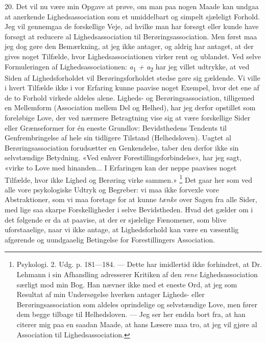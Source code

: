 \documentclass[12pt,a4paper,openany]{book}
\newcommand{\opage}[1]{\marginnote{\footnotesize\textit{[#1]}}}
\begin{document}
20. Det vil nu være min Opgave at prøve, om man paa nogen Maade kan undgaa at
anerkende Lighedsassociation som et umiddelbart og simpelt sjæleligt Forhold.
Jeg vil gennemgaa de forskellige Veje, ad hvilke man har forsøgt eller kunde
have forsøgt at reducere al Lighedsassociation til Berøringsassociation. Men
først maa jeg dog gøre den Bemærkning, at jeg ikke antager, og aldrig har
antaget, at der gives noget Tilfælde, hvor Lighedsassociationen virker rent og
ublandet. Ved selve Formuleringen af Lighedsassociationen:
\textit{a}\textsubscript{1} \textit{ + a}\textsubscript{2} har jeg villet
udtrykke, at ved Siden af Lighedsforholdet vil Berøringsforholdet stedse gøre
sig gældende. Vi ville i hvert Tilfælde ikke i vor Erfaring kunne paavise noget
Exempel, hvor det ene af de to Forhold virkede aldeles alene. Ligheds- og
Berøringsassociation, tilligemed en Mellemform (Association mellem Del og
Helhed), har jeg derfor opstillet som foreløbige Love, der ved nærmere
Betragtning vise sig at være forskellige Sider eller Grænseformer for én eneste
Grundlov: Bevidsthedens Tendents til Genfrembringelse af hele sin tidligere
Tilstand (Helhedsloven). Uagtet al Berøringsassociation forudsætter en
Genkendelse, taber den derfor ikke sin selvstændige Betydning. «Ved enhver
Forestillingsforbindelse», har jeg sagt, «virke to Love med hinanden... I
Erfaringen kan der neppe paavises noget Tilfælde, hvor ikke Lighed og Berøring
virke sammen.»%
\footnote[1]{Psykologi. 2. Udg. p. 181---184. --- Dette har imidlertid ikke
forhindret, at Dr. Lehmann i sin Afhandling adresserer Kritiken af den
\emph{rene} Lighedsassociation særligt mod min Bog. Han nævner ikke med et
eneste Ord, at jeg som Resultat af min Undersøgelse hverken antager Ligheds-
eller Berøringsassociation som aldeles oprindelige og selvstændige Love, men
fører dem begge tilbage til Helhedsloven. --- Jeg ser her endda bort fra, at
han citerer mig paa en saadan Maade, at hans Læsere maa tro, at jeg vil gjøre
al Association til Lighedsassociation.} Det gaar her som ved alle vore
psykologiske Udtryk og Begreber: vi maa ikke forvexle vore Abstraktioner, som
vi maa foretage for at kunne \emph{tænke} over Sagen fra alle Sider, med lige
saa skarpe Forskelligheder i selve Bevidstheden. Hvad det gælder om i det
følgende er da at paavise, at der er sjælelige Fænomener, som blive uforstaaelige,
\setcounter{footnote}{0}%
\opage{44}naar vi ikke antage, at Lighedsforhold kan være en væsentlig
afgørende og uundgaaelig Betingelse for Forestillingers Association.
\end{document}
